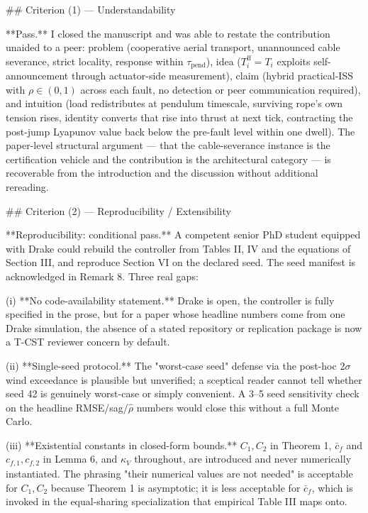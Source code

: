 ## Criterion (1) — Understandability

**Pass.** I closed the manuscript and was able to restate the contribution unaided to a peer: problem (cooperative aerial transport, unannounced cable severance, strict locality, response within $\tau_{\mathrm{pend}}$), idea ($T_i^{\mathrm{ff}} = T_i$ exploits self-announcement through actuator-side measurement), claim (hybrid practical-ISS with $\rho \in (0,1)$ across each fault, no detection or peer communication required), and intuition (load redistributes at pendulum timescale, surviving rope's own tension rises, identity converts that rise into thrust at next tick, contracting the post-jump Lyapunov value back below the pre-fault level within one dwell). The paper-level structural argument — that the cable-severance instance is the certification vehicle and the contribution is the architectural category — is recoverable from the introduction and the discussion without additional rereading.

## Criterion (2) — Reproducibility / Extensibility

**Reproducibility: conditional pass.** A competent senior PhD student equipped with Drake could rebuild the controller from Tables II, IV and the equations of Section III, and reproduce Section VI on the declared seed. The seed manifest is acknowledged in Remark 8. Three real gaps:

(i) **No code-availability statement.** Drake is open, the controller is fully specified in the prose, but for a paper whose headline numbers come from one Drake simulation, the absence of a stated repository or replication package is now a T-CST reviewer concern by default.

(ii) **Single-seed protocol.** The "worst-case seed" defense via the post-hoc 2$\sigma$ wind exceedance is plausible but unverified; a sceptical reader cannot tell whether seed 42 is genuinely worst-case or simply convenient. A 3–5 seed sensitivity check on the headline RMSE/sag/$\hat\rho$ numbers would close this without a full Monte Carlo.

(iii) **Existential constants in closed-form bounds.** $C_1, C_2$ in Theorem 1, $\bar c_f$ and $c_{f,1}, c_{f,2}$ in Lemma 6, and $\kappa_V$ throughout, are introduced and never numerically instantiated. The phrasing "their numerical values are not needed" is acceptable for $C_1, C_2$ because Theorem 1 is asymptotic; it is less acceptable for $\bar c_f$, which is invoked in the equal-sharing specialization that empirical Table III maps onto.

